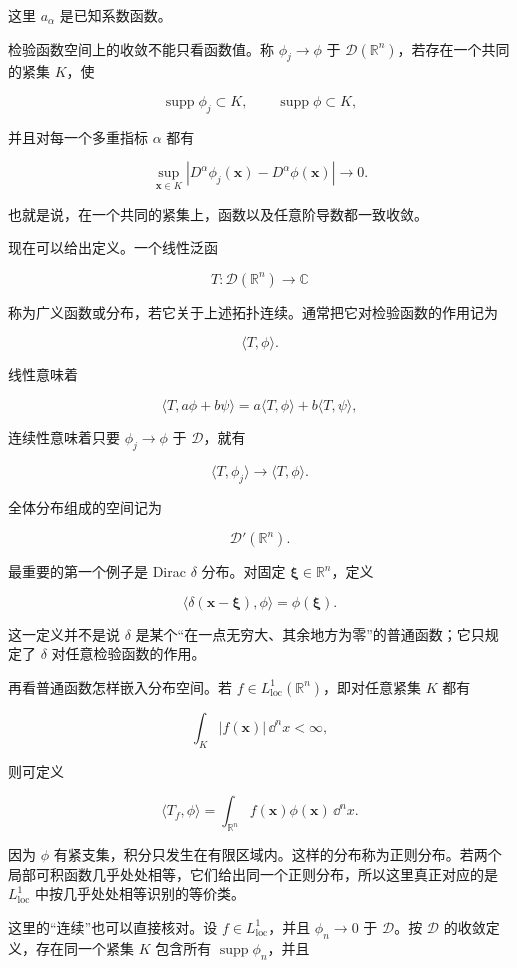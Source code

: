 这里 $a_\alpha$ 是已知系数函数。

检验函数空间上的收敛不能只看函数值。称 $\phi_j\to\phi$ 于 $\mathcal D(\mathbb R^n)$，若存在一个共同的紧集 $K$，使

\[
\operatorname{supp}\phi_j\subset K,
\qquad
\operatorname{supp}\phi\subset K,
\]

并且对每一个多重指标 $\alpha$ 都有

\[
\sup_{\mathbf x\in K}
|D^\alpha\phi_j(\mathbf x)-D^\alpha\phi(\mathbf x)|\to0.
\]

也就是说，在一个共同的紧集上，函数以及任意阶导数都一致收敛。

现在可以给出定义。一个线性泛函

\[
T:\mathcal D(\mathbb R^n)\to\mathbb C
\]

称为广义函数或分布，若它关于上述拓扑连续。通常把它对检验函数的作用记为

\[
\langle T,\phi\rangle.
\]

线性意味着

\[
\langle T,a\phi+b\psi\rangle
=a\langle T,\phi\rangle+b\langle T,\psi\rangle,
\]

连续性意味着只要 $\phi_j\to\phi$ 于 $\mathcal D$，就有

\[
\langle T,\phi_j\rangle\to\langle T,\phi\rangle.
\]

全体分布组成的空间记为

\[
\mathcal D'(\mathbb R^n).
\]

最重要的第一个例子是 Dirac $\delta$ 分布。对固定 $\boldsymbol\xi\in\mathbb R^n$，定义

\[
\boxed{
\langle\delta(\mathbf x-\boldsymbol\xi),\phi\rangle
=\phi(\boldsymbol\xi)
}.
\]

这一定义并不是说 $\delta$ 是某个``在一点无穷大、其余地方为零''的普通函数；它只规定了 $\delta$ 对任意检验函数的作用。

再看普通函数怎样嵌入分布空间。若 $f\in L^1_{\mathrm{loc}}(\mathbb R^n)$，即对任意紧集 $K$ 都有

\[
\int_K|f(\mathbf x)|\,\dd^n x<\infty,
\]

则可定义

\[
\boxed{
\langle T_f,\phi\rangle
=\int_{\mathbb R^n}f(\mathbf x)\phi(\mathbf x)\,\dd^n x
}.
\]

因为 $\phi$ 有紧支集，积分只发生在有限区域内。这样的分布称为正则分布。若两个局部可积函数几乎处处相等，它们给出同一个正则分布，所以这里真正对应的是 $L^1_{\mathrm{loc}}$ 中按几乎处处相等识别的等价类。

这里的``连续''也可以直接核对。设 $f\in L^1_{\mathrm{loc}}$，并且 $\phi_n\to0$ 于 $\mathcal D$。按 $\mathcal D$ 的收敛定义，存在同一个紧集 $K$ 包含所有 $\operatorname{supp}\phi_n$，并且

